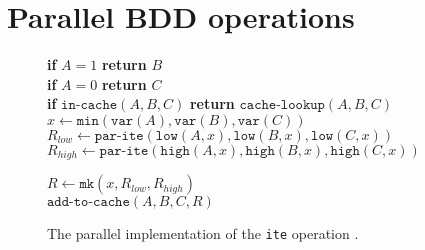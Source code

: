 \section{Parallel BDD operations}
\begin{figure}
	\centering
	\begin{algorithm}[H]
		\SetStartEndCondition{ }{}{}%
		\AlgoDontDisplayBlockMarkers\SetAlgoNoEnd\SetAlgoNoLine%

		 {
			\textbf{if} $A=1$ \textbf{return} $B$ \\
			\textbf{if} $A=0$ \textbf{return} $C$ \\
			\textbf{if} $\texttt{in-cache}(A, B, C)$ \textbf{return} $\texttt{cache-lookup}(A,B,C)$ \\
			$x \gets \texttt{min}(\texttt{var}(A), \texttt{var}(B), \texttt{var}(C))$ \\

			\While{} {
				$R_{low} \gets \texttt{par-ite}(\texttt{low}(A, x), \texttt{low}(B, x), \texttt{low}(C, x))$ \\
				$R_{high} \gets \texttt{par-ite}(\texttt{high}(A, x), \texttt{high}(B, x), \texttt{high}(C, x))$ \\
			}

			
			$R \gets \texttt{mk}(x, R_{low}, R_{high})$ \\
			$\texttt{add-to-cache}(A, B, C, R)$ \\
		}
	\end{algorithm}

	\caption{The parallel implementation of the \texttt{ite} operation \cite{sylvan_multicore_bdd}.}
	\label{fig:ite_par}
\end{figure}

